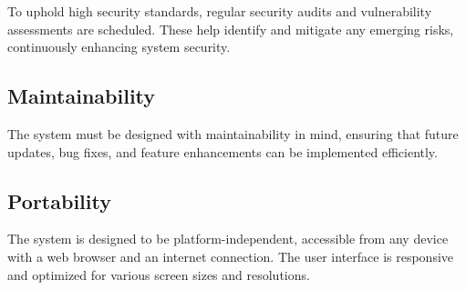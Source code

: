 To uphold high security standards, regular security audits and vulnerability assessments are scheduled.
These help identify and mitigate any emerging risks, continuously enhancing system security.

\subsection{Maintainability}

The system must be designed with maintainability in mind, ensuring that future updates, bug fixes, and feature enhancements can be implemented efficiently.

\subsection{Portability}

The system is designed to be platform-independent, accessible from any device with a web browser and an internet connection. The user interface is responsive and optimized for various screen sizes and resolutions.
